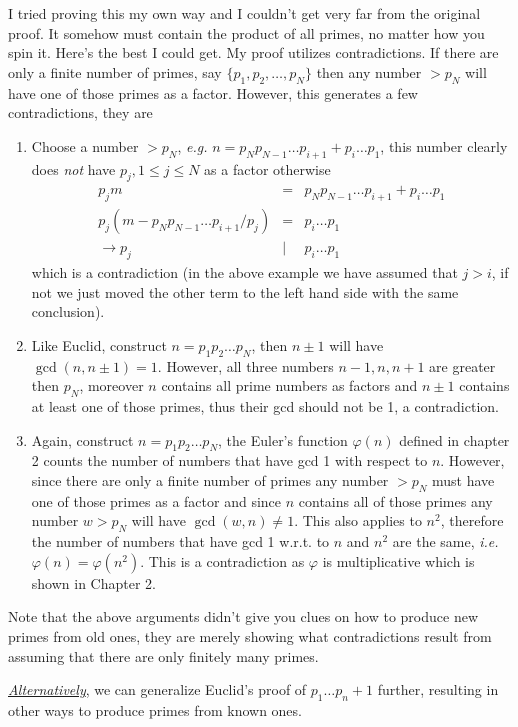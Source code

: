 \documentclass[aps,preprint,preprintnumbers,nofootinbib,showpacs,prd]{revtex4-1}
\newcommand{\ie}{{\it i.e.} }
\newcommand{\eg}{{\it e.g.} }
\newcommand{\nbea}{\begin{eqnarray*}}
\newcommand{\neea}{\end{eqnarray*}}
\begin{document}
I tried proving this my own way and I couldn't get very far from the original proof. It somehow must contain the product of all primes, no matter how you spin it. Here's the best I could get. My proof utilizes contradictions. If there are only a finite number of primes, say $\{p_1, p_2, \dots, p_N\}$ then any number $> p_N$ will have one of  those primes as a factor. However, this generates a few contradictions, they are
%
\begin{enumerate}
\item Choose a number $> p_N$, \eg $n = p_N p_{N-1} \dots p_{i+1} + p_i \dots p_1$, this number clearly does {\it not} have $p_j, 1 \le j \le N$ as a factor otherwise
%
\nbea
p_j m & = & p_N p_{N-1} \dots p_{i+1} + p_i \dots p_1 \\
p_j (m - p_N p_{N-1} \dots p_{i+1}/ p_j) & = & p_i \dots p_1 \\
\to p_j & | & p_i \dots p_1
\neea
%
which is a contradiction (in the above example we have assumed that $j > i$, if not we just moved the other term to the left hand side with the same conclusion).
%
\item Like Euclid, construct $n = p_1 p_2 \dots p_N$, then $n \pm 1$ will have $\gcd(n, n\pm 1) = 1$. However, all three numbers $n-1, n, n+1$ are greater then $p_N$, moreover $n$ contains all prime numbers as factors and $n \pm 1$ contains at least one of those primes, thus their gcd should not be 1, a contradiction.
%
\item Again, construct $n = p_1 p_2 \dots p_N$, the Euler's function $\varphi(n)$ defined in chapter 2 counts the number of numbers that have gcd 1 with respect to $n$. However, since there are only a finite number of primes any number $> p_N$ must have one of those primes as a factor and since $n$ contains all of those primes any number $w > p_N$ will have $\gcd(w, n) \neq 1$. This also applies to $n^2$, therefore the number of numbers that have gcd 1 w.r.t. to $n$ and $n^2$ are the same, \ie $\varphi(n) = \varphi(n^2)$. This is a contradiction as $\varphi$ is multiplicative which is shown in Chapter 2.  
\end{enumerate}
Note that the above arguments didn't give you clues on how to produce new primes from old ones, they are merely showing what contradictions result from assuming that there are only finitely many primes.

\underline {\textit{Alternatively}}, we can generalize Euclid's proof of $p_1 \dots p_n + 1$ further, resulting in other ways to produce primes from known ones.
\end{document}
